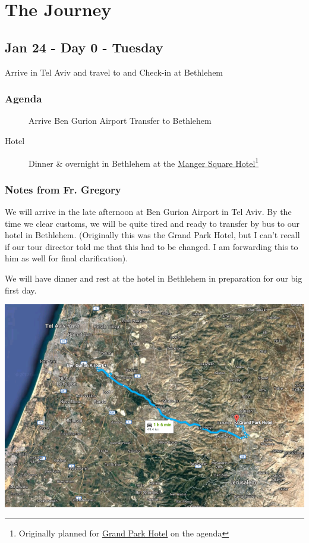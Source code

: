 \documentclass[letterpaper]{report}
\begin{document}
\chapter{The Journey}
\section{Jan 24 - Day 0 - Tuesday}
Arrive in Tel Aviv and travel to and Check-in at Bethlehem

\subsection{Agenda}
\begin{description}
  \item[] Arrive Ben Gurion Airport Transfer to Bethlehem
  \item[Hotel] Dinner \& overnight in Bethlehem at the 
    \href{http://www.mangersquarehotel.com/}{
      Manger Square Hotel}\footnote{
        Originally planned for \href{http://www.grandpark.com/bethlehem/}{
          Grand Park Hotel} on the agenda}
\end{description}

\subsection{Notes from Fr. Gregory}
We will arrive in the late afternoon at Ben Gurion Airport in Tel Aviv.
By the time we clear customs, we will be quite tired and ready to transfer by bus 
to our hotel in Bethlehem.
(Originally this was the Grand Park Hotel, but I can't recall if our tour 
director told me that this had to be changed.
I am forwarding this to him as well for final clarification).


We will have dinner and rest at the hotel in Bethlehem in preparation for our
big first day.

\includegraphics[width=\textwidth]{AirportToHotel}
\end{document}
